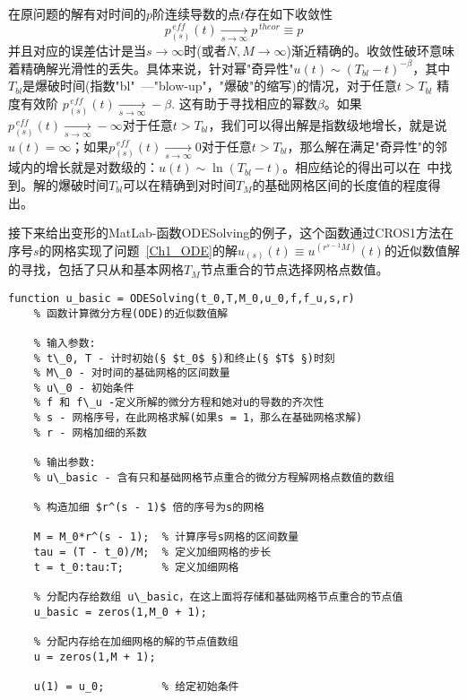 \documentclass[twoside]{book}
\begin{document}
\begin{CJK*}{GBK}{song}
在原问题的解有对时间的$p$阶连续导数的点$t$存在如下收敛性
\begin{equation*}
    \label{convergence_2}
    p^{\, eff}_{(s)}(t) \xrightarrow[s \to \infty]{} p^{\, theor} \equiv p
\end{equation*}
并且对应的误差估计是当$s \to \infty$时(或者$N,M \to \infty$)渐近精确的。收敛性破环意味着精确解光滑性的丢失。具体来说，针对幂"奇异性"$u(t) \sim (T_{bl} - t)^{-\beta}$，其中$T_{bl}$是爆破时间(指数"bl"~---"blow-up"，"爆破"的缩写)的情况，对于任意$t > T_{bl}$ 精度有效阶 $p_{(s)}^{\, eff}(t) \xrightarrow[s \to \infty]{}  -\beta$. 这有助于寻找相应的幂数$\beta$。如果$p_{(s)}^{\, eff}(t) \xrightarrow[s \to \infty]{}  -\infty$对于任意$t > T_{bl}$，我们可以得出解是指数级地增长，就是说$u(t) = \infty$；如果$p_{(s)}^{\, eff}(t) \xrightarrow[s \to \infty]{} 0$对于任意$t > T_{bl}$，那么解在满足"奇异性"的邻域内的增长就是对数级的：$u(t) \sim \ln(T_{bl} - t)$。相应结论的得出可以在~\cite{BUE_basic_1,BUE_basic_2}中找到。解的爆破时间$T_{bl}$可以在精确到对时间$T_M$的基础网格区间的长度值的程度得出。




接下来给出变形的MatLab-函数ODESolving的例子，这个函数通过CROS1方法在序号$s$的网格实现了问题~\eqref{Ch1_ODE}的解$u_{(s)}(t) \equiv u^{(r^{s - 1}M)}(t)$的近似数值解的寻找，包括了只从和基本网格$T_M$节点重合的节点选择网格点数值。

\newpage
\begin{lstlisting}
function u_basic = ODESolving(t_0,T,M_0,u_0,f,f_u,s,r)
    % 函数计算微分方程(ODE)的近似数值解

    % 输入参数:
    % t\_0, T - 计时初始(§ $t_0$ §)和终止(§ $T$ §)时刻
    % M\_0 - 对时间的基础网格的区间数量
    % u\_0 - 初始条件
    % f 和 f\_u -定义所解的微分方程和她对u的导数的齐次性
    % s - 网格序号，在此网格求解(如果s = 1，那么在基础网格求解)
    % r - 网格加细的系数

    % 输出参数:
    % u\_basic - 含有只和基础网格节点重合的微分方程解网格点数值的数组

    % 构造加细 $r^(s - 1)$ 倍的序号为s的网格

    M = M_0*r^(s - 1);  % 计算序号s网格的区间数量
    tau = (T - t_0)/M;  % 定义加细网格的步长
    t = t_0:tau:T;      % 定义加细网格

    % 分配内存给数组 u\_basic，在这上面将存储和基础网格节点重合的节点值
    u_basic = zeros(1,M_0 + 1);

    % 分配内存给在加细网格的解的节点值数组
    u = zeros(1,M + 1);

    u(1) = u_0;         % 给定初始条件


\end{lstlisting}
\end{CJK*}
\end{document}
